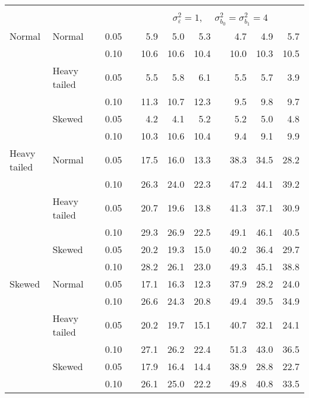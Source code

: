 \begin{table}[ht]
\begin{scriptsize}
\begin{center}
\begin{tabular}{ll p{.1cm} c p{.1cm} rrr p{.1cm} rrr}
&&&&&&&&&&&\\
& && && \multicolumn{7}{c}{$\sigma_{\varepsilon}^2 = 1$, \ \ $\sigma_{b_0}^2 = \sigma_{b_1}^2 = 4$} \\ \cline{6-12}
Normal       & Normal       && 0.05 &&   5.9 & 5.0 & 5.3 &   & 4.7 & 4.9 & 5.7 \\ 
             &              && 0.10 &&   10.6 & 10.6 & 10.4 &   & 10.0 & 10.3 & 10.5 \\ 
             & Heavy tailed && 0.05 &&   5.5 & 5.8 & 6.1 &   & 5.5 & 5.7 & 3.9 \\ 
             &              && 0.10 &&   11.3 & 10.7 & 12.3 &   & 9.5 & 9.8 & 9.7 \\ 
             & Skewed       && 0.05 &&   4.2 & 4.1 & 5.2 &   & 5.2 & 5.0 & 4.8 \\ 
             &              && 0.10 &&   10.3 & 10.6 & 10.4 &   & 9.4 & 9.1 & 9.9 \\ 
Heavy tailed & Normal       && 0.05 &&   17.5 & 16.0 & 13.3 &   & 38.3 & 34.5 & 28.2 \\ 
             &              && 0.10 &&   26.3 & 24.0 & 22.3 &   & 47.2 & 44.1 & 39.2 \\ 
             & Heavy tailed && 0.05 &&   20.7 & 19.6 & 13.8 &   & 41.3 & 37.1 & 30.9 \\ 
             &              && 0.10 &&   29.3 & 26.9 & 22.5 &   & 49.1 & 46.1 & 40.5 \\ 
             & Skewed       && 0.05 &&   20.2 & 19.3 & 15.0 &   & 40.2 & 36.4 & 29.7 \\ 
             &              && 0.10 &&   28.2 & 26.1 & 23.0 &   & 49.3 & 45.1 & 38.8 \\ 
Skewed       & Normal       && 0.05 &&   17.1 & 16.3 & 12.3 &   & 37.9 & 28.2 & 24.0 \\ 
             &              && 0.10 &&   26.6 & 24.3 & 20.8 &   & 49.4 & 39.5 & 34.9 \\ 
             & Heavy tailed && 0.05 &&   20.2 & 19.7 & 15.1 &   & 40.7 & 32.1 & 24.1 \\ 
             &              && 0.10 &&   27.1 & 26.2 & 22.4 &   & 51.3 & 43.0 & 36.5 \\ 
             & Skewed       && 0.05 &&   17.9 & 16.4 & 14.4 &   & 38.9 & 28.8 & 22.7 \\ 
             &              && 0.10 &&   26.1 & 25.0 & 22.2 &   & 49.8 & 40.8 & 33.5 \\ 

\hline
\end{tabular}
\end{center}
\end{scriptsize}
\end{table}

